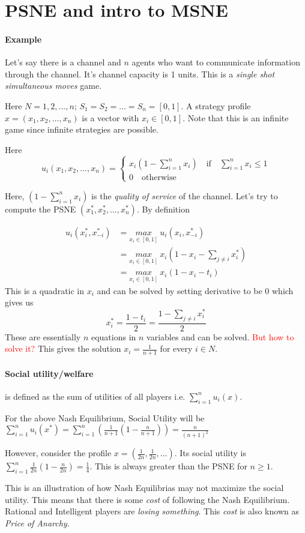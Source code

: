 \section{PSNE and intro to MSNE}
\paragraph{Example} Let's say there is a channel and $n$ agents who want to communicate information through the channel. It's channel capacity is 1 units. This is a \textit{single shot simultaneous moves} game.

Here $N = {1,2, ..., n}$; $S_1 = S_2 = ... = S_n = [0,1]$. A strategy profile $x = (x_1, x_2, ..., x_n)$ is a vector with $x_i \in [0, 1]$. Note that this is an infinite game since infinite strategies are possible.

Here 
\[
u_i(x_1, x_2, ..., x_n) = 
\begin{cases}
x_i(1 - \sum_{i=1}^{n}x_i) \quad \text{if} \quad \sum_{i=1}^{n}x_i \leq 1\\
0 \quad \text{otherwise}
\end{cases}
\]

Here, $(1 - \sum_{i=1}^{n}x_i)$ is the \textit{quality of service} of the channel. Let's try to compute the PSNE $(x_1^*, x_2^*, ..., x_n^*)$. By definition


\begin{align*}
u_i(x_i^*, x_{-i}^*)
& = \underset{x_i \in [0,1]}{max}~u_i(x_i, x_{-i}^*)\\
& = \underset{x_i \in [0,1]}{max}~x_i(1 - x_i - \sum_{j \neq i}x_i^*)\\
& = \underset{x_i \in [0,1]}{max}~x_i(1 - x_i - t_i)
\end{align*}
This is a quadratic in $x_i$ and can be solved by setting derivative to be 0 which gives us 
\[
x_i^* = \frac{1 - t_i}{2} = \frac{1 - \sum_{j \neq i}x_i^*}{2}
\]
These are essentially $n$ equations in $n$ variables and can be solved. \textcolor{red}{But how to solve it?} This gives the solution $x_i = \frac{1}{n+1}$ for every $i \in N$.

\paragraph{Social utility/welfare} is defined as the sum of utilities of all players i.e. $\sum_{i=1}^{n}u_i(x)$. 

For the above Nash Equilibrium, Social Utility will be $\sum_{i=1}^{n}u_i(x^*) = \sum_{i=1}^{n}(\frac{1}{n+1}(1 - \frac{n}{n+1})) = \frac{n}{(n+1)^2}$

However, consider the profile $x = (\frac{1}{2n}, \frac{1}{2n}, ...)$. Its social utility is $\sum_{i=1}^{n}\frac{1}{2n}(1 - \frac{n}{2n}) = \frac{1}{4}$. This is always greater than the PSNE for $n \geq 1$. 

This is an illustration of how Nash Equilibrias may not maximize the social utility. This means that there is some \textit{cost} of following the Nash Equilibrium. Rational and Intelligent players are \textit{losing something}. This \textit{cost} is also known as \textit{Price of Anarchy}.



